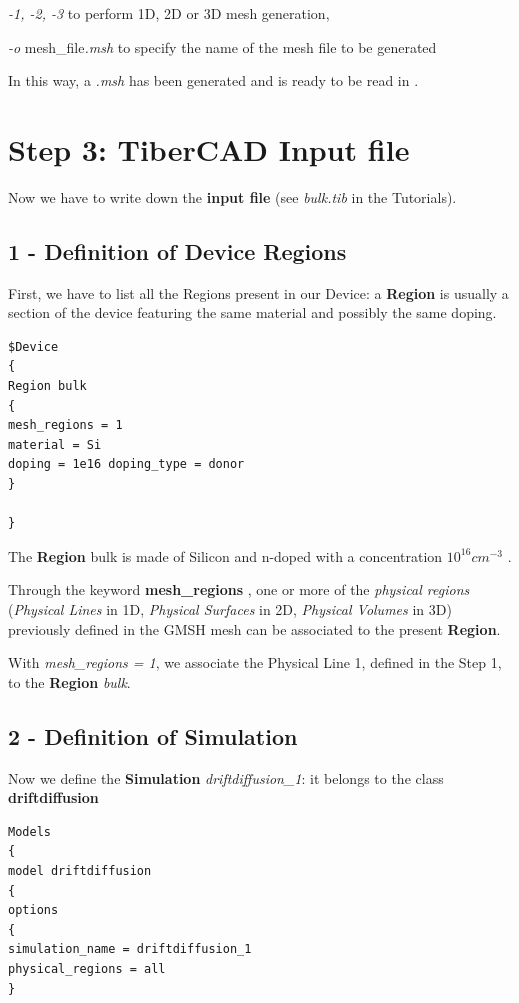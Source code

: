 \textit{-1, -2, -3} to perform 1D, 2D or 3D mesh generation,

\textit{-o} mesh\_file\textit{.msh} to specify the name of the mesh file to be generated

In this way, a \textit{.msh} has been generated and is ready to be read in \TiberCAD{}. 





\section*{Step 3: TiberCAD{}  Input file  }

Now we have to write down the \TiberCAD{} \textbf{input file} (see \textit{bulk.tib} in  the  Tutorials).


\subsection* {1 - Definition of Device Regions}
First, we have to list all the \TiberCAD{} Regions present in our Device: a \TiberCAD{} \textbf{Region} is usually a section of the device featuring the same material and possibly the same doping.
\begin{verbatim}
$Device
{
Region bulk
{
mesh_regions = 1
material = Si
doping = 1e16 doping_type = donor
}

}
\end{verbatim}
The \TiberCAD{} \textbf{Region} bulk is made of Silicon and n-doped with a concentration $10^{16} cm^{-3}$ .

Through the keyword  \textbf{mesh\_regions} , one or more of the \textit{physical regions} (\textit{Physical Lines} in 1D, \textit{Physical Surfaces} in 2D, \textit{Physical Volumes} in 3D) previously defined in the GMSH mesh can be associated to the present  \TiberCAD{} \textbf{Region}.

With \textit{mesh\_regions = 1}, we associate the Physical Line 1, defined in the Step 1, to the \TiberCAD{} \textbf{Region} \textit{bulk}.

\subsection* {2 - Definition of Simulation}

Now we define the \textbf{Simulation} \textit{driftdiffusion\_1}: it belongs to  the class \textbf{driftdiffusion}
\begin{verbatim}
Models
{
model driftdiffusion
{
options
{
simulation_name = driftdiffusion_1
physical_regions = all
}
\end{verbatim}

